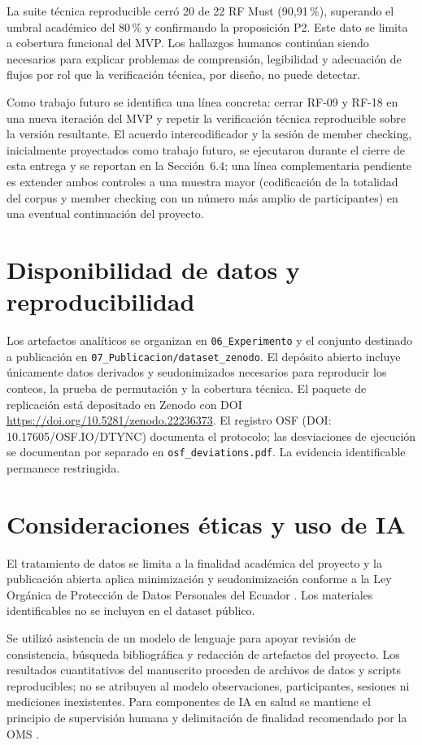 \documentclass[runningheads]{llncs}
\begin{document}
	La suite técnica reproducible cerró 20 de 22 RF Must (90,91\,\%), superando el umbral académico del 80\,\% y confirmando la proposición P2. Este dato se limita a cobertura funcional del MVP. Los hallazgos humanos continúan siendo necesarios para explicar problemas de comprensión, legibilidad y adecuación de flujos por rol que la verificación técnica, por diseño, no puede detectar.
	
	Como trabajo futuro se identifica una línea concreta: cerrar RF-09 y RF-18 en una nueva iteración del MVP y repetir la verificación técnica reproducible sobre la versión resultante. El acuerdo intercodificador y la sesión de member checking, inicialmente proyectados como trabajo futuro, se ejecutaron durante el cierre de esta entrega y se reportan en la Sección~6.4; una línea complementaria pendiente es extender ambos controles a una muestra mayor (codificación de la totalidad del corpus y member checking con un número más amplio de participantes) en una eventual continuación del proyecto.
	
	\section{Disponibilidad de datos y reproducibilidad}
	Los artefactos analíticos se organizan en \texttt{06\_Experimento} y el conjunto destinado a publicación en \texttt{07\_Publicacion/dataset\_zenodo}. El depósito abierto incluye únicamente datos derivados y seudonimizados necesarios para reproducir los conteos, la prueba de permutación y la cobertura técnica. El paquete de replicación está depositado en Zenodo con DOI \url{https://doi.org/10.5281/zenodo.22236373}. El registro OSF (DOI: 10.17605/OSF.IO/DTYNC) documenta el protocolo; las desviaciones de ejecución se documentan por separado en \texttt{osf\_deviations.pdf}. La evidencia identificable permanece restringida.
	
	\section{Consideraciones éticas y uso de IA}
	El tratamiento de datos se limita a la finalidad académica del proyecto y la publicación abierta aplica minimización y seudonimización conforme a la Ley Orgánica de Protección de Datos Personales del Ecuador \cite{loppd}. Los materiales identificables no se incluyen en el dataset público.
	
	Se utilizó asistencia de un modelo de lenguaje para apoyar revisión de consistencia, búsqueda bibliográfica y redacción de artefactos del proyecto. Los resultados cuantitativos del manuscrito proceden de archivos de datos y scripts reproducibles; no se atribuyen al modelo observaciones, participantes, sesiones ni mediciones inexistentes. Para componentes de IA en salud se mantiene el principio de supervisión humana y delimitación de finalidad recomendado por la OMS \cite{whoai2021}.
	
	
	
	
	
\end{document}
